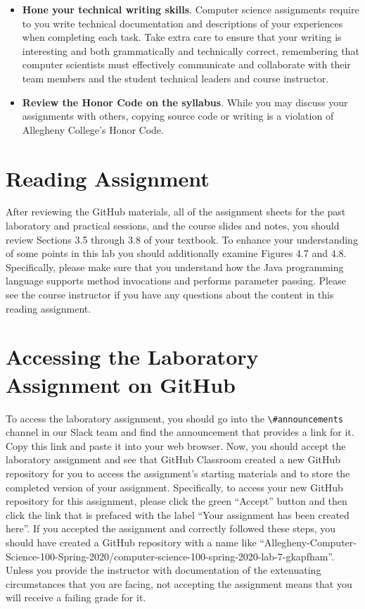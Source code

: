\documentclass[11pt]{article}
\newcommand{\channel}[1]{\lstinline{#1}}
\begin{document}
\begin{itemize}
\item {\bf Hone your technical writing skills}. Computer science assignments
  require to you write technical documentation and descriptions of your
  experiences when completing each task. Take extra care to ensure that your
  writing is interesting and both grammatically and technically correct,
  remembering that computer scientists must effectively communicate and
  collaborate with their team members and the student technical leaders and
  course instructor.

\item {\bf Review the Honor Code on the syllabus}. While you may discuss your
  assignments with others, copying source code or writing is a violation of
  Allegheny College's Honor Code.

\end{itemize}

\section*{Reading Assignment}

After reviewing the GitHub materials, all of the assignment sheets for the past
laboratory and practical sessions, and the course slides and notes, you should
review Sections 3.5 through 3.8 of your textbook. To enhance your understanding
of some points in this lab you should additionally examine Figures 4.7 and 4.8.
Specifically, please make sure that you understand how the Java programming
language supports method invocations and performs parameter passing. Please see
the course instructor if you have any questions about the content in this
reading assignment.

\section*{Accessing the Laboratory Assignment on GitHub}

To access the laboratory assignment, you should go into the
\channel{\#announcements} channel in our Slack team and find the announcement
that provides a link for it. Copy this link and paste it into your web browser.
Now, you should accept the laboratory assignment and see that GitHub Classroom
created a new GitHub repository for you to access the assignment's starting
materials and to store the completed version of your assignment. Specifically,
to access your new GitHub repository for this assignment, please click the
green ``Accept'' button and then click the link that is prefaced with the label
``Your assignment has been created here''. If you accepted the assignment and
correctly followed these steps, you should have created a GitHub repository
with a name like
``Allegheny-Computer-Science-100-Spring-2020/computer-science-100-spring-2020-lab-7-gkapfham''.
Unless you provide the instructor with documentation of the extenuating
circumstances that you are facing, not accepting the assignment means that you
will receive a failing grade for it.
\end{document}
